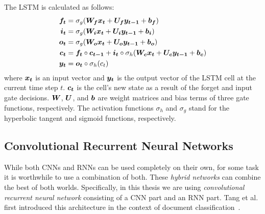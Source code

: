 The LSTM is calculated as follows:
$$
  \begin{aligned}
\boldsymbol{f_t} &= \sigma_g(\boldsymbol{W_{f}} \boldsymbol{x_t} + \boldsymbol{U_{f}} \boldsymbol{y_{t-1}} + \boldsymbol{b_f}) \\
\boldsymbol{i_t} &= \sigma_g(\boldsymbol{W_{i}} \boldsymbol{x_t} + \boldsymbol{U_{i}} \boldsymbol{y_{t-1}} + \boldsymbol{b_i}) \\
\boldsymbol{o_t} &= \sigma_g(\boldsymbol{W_{o}} \boldsymbol{x_t} + \boldsymbol{U_{o}} \boldsymbol{y_{t-1}} + \boldsymbol{b_o}) \\
\boldsymbol{c_t} &= \boldsymbol{f_t} \circ \boldsymbol{c_{t-1}} + \boldsymbol{i_t} \circ \sigma_h(\boldsymbol{W_{c}} \boldsymbol{x_t} + \boldsymbol{U_{c}} \boldsymbol{y_{t-1}} + \boldsymbol{b_c}) \\
\boldsymbol{y_t} &= \boldsymbol{o_t} \circ \sigma_h(c_t)
  \end{aligned}
$$
where $\boldsymbol{x_t}$ is an input vector and $\boldsymbol{y_t}$ is the output vector of the LSTM cell at the current time step $t$. $\boldsymbol{c_t}$ is the cell's new state as a result of the forget and input gate decisions. $\boldsymbol{W}$, $\boldsymbol{U}$, and $\boldsymbol{b}$ are weight matrices and bias terms of three gate functions, respectively. The activation functions $\sigma_h$ and $\sigma_g$ stand for the hyperbolic tangent and sigmoid functions, respectively.


\subsection{Convolutional Recurrent Neural Networks}
\label{sec:hybrid_networks}
While both CNNs and RNNs can be used completely on their own, for some task it is worthwhile to use a combination of both. These \emph{hybrid networks} can combine the best of both worlds. Specifically, in this thesis we are using \emph{convolutional recurrent neural network} consisting of a CNN part and an RNN part. Tang et al. first introduced this architecture in the context of document classification~\cite{tang2015document}.


